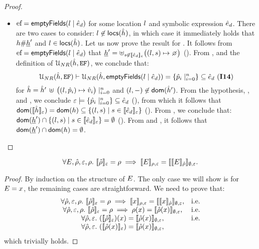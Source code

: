 \begin{proof}
\begin{itemize}
  \item $\mathtt{\text{ef}} = \mathsf{emptyFields}(l \mid \hat{e}_d)$ for some location $l$ and symbolic expression $\hat{e}_d$. 
           There are two cases to consider:  $l \not\in {\sf locs}(\hat{h})$, in which case 
	    it immediately holds that $h \# \underline{h}'$ and  $l \in {\sf locs}(\hat{h})$. 
	    Let us now prove the result for . 
	    It follows from $\mathtt{\text{ef}} = \mathsf{emptyFields}(l \mid \hat{e}_d)$ that $\iheap' = \uplus_{\jstring \not\in \symbeval{\sexpr_d}{\senv}}\big((\loc, \jstring) \mapsto \none\big)$ (). 
            From , and the definition of ${\cal U}_{NR}(\hat{h}, \mathtt{EF})$, 
	    we conclude that: 
	    $$
	       {\cal U}_{NR}(\hat{h}, \mathtt{EF}) \vdash {\cal U}_{NR}(\hat{h}, \mathsf{emptyFields}(l \mid \hat{e}_d)) =  \{ \hat{p}_i \mid_{i = 0}^n \} \subseteq \hat{e}_d \text{ ({\bf I14})} 
	    $$
	    for $\hat{h} = \hat{h}' \, \uplus \,  \big((l, \hat{p}_i) \mapsto \hat{v}_i\big)\mid_{i = 0}^n$ and $(l, -) \not\in \mathsf{dom}(\hat{h}')$. 
	    From the hypothesis, , and , we conclude $\varepsilon \models \{ \hat{p}_i \mid_{i = 0}^n \} \subseteq \hat{e}_d$ (), 
	    from which it follows that $\mathsf{dom}(\llbracket \hat{h} \rrbracket_{\varepsilon}) = \mathsf{dom}(h) \subseteq \{ (l, s) \mid s \in \llbracket \hat{e}_d \rrbracket_{\varepsilon} \}$ (). 
	    From , we conclude that: $\mathsf{dom}(\underline{h}') \cap \{ (l, s) \mid s \in  \llbracket \hat{e}_d \rrbracket_{\varepsilon} \} = \emptyset$ ().
	    From  and , it follows that $\mathsf{dom}(\underline{h}') \cap \mathsf{dom}(h) = \emptyset$. 
\end{itemize}
\end{proof}

\begin{lemma}\label{lemma:expr:storev}
$$
\forall \lexpr, \sstore, \senv, \store.\ \symbeval{\sstore}{\senv} = \store \implies \symbeval{\lexpr}{\store, \senv} = \symbeval{\symbeval{\lexpr}{\sstore}}{\emptystore, \senv}.
$$
\end{lemma}
\begin{proof}
By induction on the structure of $E$. 
The only case we will show is for $E = x$, the remaining cases are straightforward. 
We need to prove that:
$$
\begin{array}{cl}
\forall \hat\rho, \varepsilon, \rho.\ \llbracket \hat\rho \rrbracket_{\varepsilon} = \rho \implies \llbracket x \rrbracket_{\rho, \varepsilon} = \llbracket \llbracket x \rrbracket_{\hat\rho} \rrbracket_{\emptyset, \varepsilon}, & \text{i.e.} \\
\forall \hat\rho, \varepsilon, \rho.\ \llbracket \hat\rho \rrbracket_{\varepsilon} = \rho \implies \rho(x) = \llbracket \hat\rho(x) \rrbracket_{\emptyset, \varepsilon}, & \text{i.e.} \\
\forall \hat\rho, \varepsilon.\ (\llbracket \hat\rho \rrbracket_{\varepsilon})(x) = \llbracket \hat\rho(x) \rrbracket_{\emptyset, \varepsilon}, & \text{i.e.} \\
\forall \hat\rho, \varepsilon.\ (\llbracket \hat\rho(x) \rrbracket_{\varepsilon}) = \llbracket \hat\rho(x) \rrbracket_{\emptyset, \varepsilon}, & 
\end{array}
$$
\noindent which trivially holds.
\end{proof}

